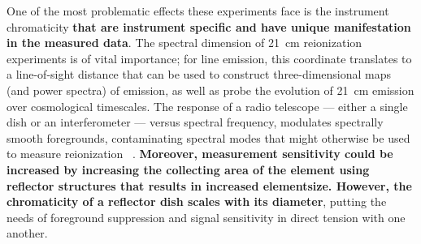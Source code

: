 \documentclass[twocolumn]{emulateapj}
\begin{document}
    One of the most problematic effects these experiments face is the instrument
    chromaticity \textbf{that are instrument specific and have unique manifestation in the measured data}.  The spectral dimension of    
    21~cm reionization experiments is of vital
    importance; for line emission, this coordinate translates to a line-of-sight distance
    that can be used to construct three-dimensional maps (and power spectra) of emission,
    as well as probe the evolution of 21~cm emission over cosmological timescales.
    The response of a radio telescope --- either a single dish
    or an interferometer --- versus spectral frequency, modulates spectrally smooth foregrounds,
    contaminating spectral modes that might
    otherwise be used to measure reionization ~\citep{datta_et_al2010, trott_et_al2012, vedantham_et_al2012, 2012ApJ...752..137M, liu_et_al2014a}. \textbf{  Moreover, measurement sensitivity could be increased by increasing the collecting area of the element using reflector structures that  results in increased elementsize.  However, the chromaticity of
  a reflector dish scales with its diameter}, putting the
    needs of foreground suppression and signal sensitivity in direct tension with one
    another. 
    
\end{document}
